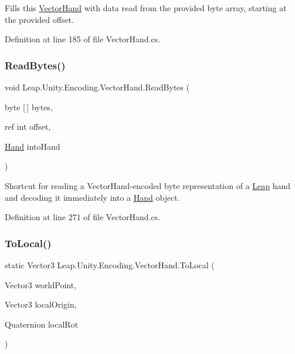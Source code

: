 Fills this \mbox{\hyperlink{class_leap_1_1_unity_1_1_encoding_1_1_vector_hand}{Vector\+Hand}} with data read from the provided byte array, starting at the provided offset. 



Definition at line 185 of file Vector\+Hand.\+cs.

\mbox{\label{class_leap_1_1_unity_1_1_encoding_1_1_vector_hand_a933acd17a4ff101050a616f294e2c46c}} 
\subsubsection{\texorpdfstring{ReadBytes()}{ReadBytes()}\hspace{0.1cm}{\footnotesize\ttfamily [2/2]}}
{\footnotesize\ttfamily void Leap.\+Unity.\+Encoding.\+Vector\+Hand.\+Read\+Bytes (\begin{DoxyParamCaption}\item[{byte \mbox{[}$\,$\mbox{]}}]{bytes,  }\item[{ref int}]{offset,  }\item[{\mbox{\hyperlink{class_leap_1_1_hand}{Hand}}}]{into\+Hand }\end{DoxyParamCaption})}



Shortcut for reading a Vector\+Hand-\/encoded byte representation of a \mbox{\hyperlink{namespace_leap_1_1_unity_1_1_leap}{Leap}} hand and decoding it immediately into a \mbox{\hyperlink{class_leap_1_1_hand}{Hand}} object. 



Definition at line 271 of file Vector\+Hand.\+cs.

\mbox{\label{class_leap_1_1_unity_1_1_encoding_1_1_vector_hand_a722895d0b8abc8e2226a4591c3708c7a}} 
\subsubsection{\texorpdfstring{ToLocal()}{ToLocal()}}
{\footnotesize\ttfamily static Vector3 Leap.\+Unity.\+Encoding.\+Vector\+Hand.\+To\+Local (\begin{DoxyParamCaption}\item[{Vector3}]{world\+Point,  }\item[{Vector3}]{local\+Origin,  }\item[{Quaternion}]{local\+Rot }\end{DoxyParamCaption})\hspace{0.3cm}{\ttfamily [static]}}



